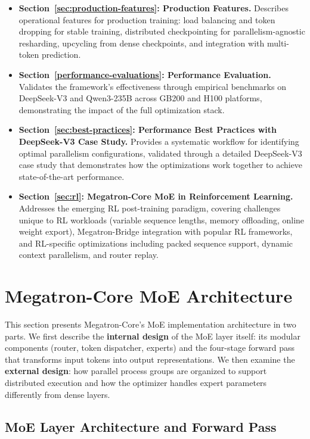 \begin{itemize}
\item \textbf{Section~\ref{sec:production-features}: Production Features.}
Describes operational features for production training: load balancing and token dropping for stable training, distributed checkpointing for parallelism-agnostic resharding, upcycling from dense checkpoints, and integration with multi-token prediction.

\item \textbf{Section~\ref{performance-evaluations}: Performance Evaluation.}
Validates the framework's effectiveness through empirical benchmarks on DeepSeek-V3 and Qwen3-235B across GB200 and H100 platforms, demonstrating the impact of the full optimization stack.

\item \textbf{Section~\ref{sec:best-practices}: Performance Best Practices with DeepSeek-V3 Case Study.}
Provides a systematic workflow for identifying optimal parallelism configurations, validated through a detailed DeepSeek-V3 case study that demonstrates how the optimizations work together to achieve state-of-the-art performance.

\item \textbf{Section~\ref{sec:rl}: Megatron-Core MoE in Reinforcement Learning.}
Addresses the emerging RL post-training paradigm, covering challenges unique to RL workloads (variable sequence lengths, memory offloading, online weight export), Megatron-Bridge integration with popular RL frameworks, and RL-specific optimizations including packed sequence support, dynamic context parallelism, and router replay.

\end{itemize}


\section{Megatron-Core MoE Architecture}\label{meg-core-architecture}

This section presents Megatron-Core's MoE implementation architecture in two parts. We first describe the \textbf{internal design} of the MoE layer itself: its modular components (router, token dispatcher, experts) and the four-stage forward pass that transforms input tokens into output representations. We then examine the \textbf{external design}: how parallel process groups are organized to support distributed execution and how the optimizer handles expert parameters differently from dense layers.

\subsection{MoE Layer Architecture and Forward Pass}\label{sec:moe-layer-architecture}

